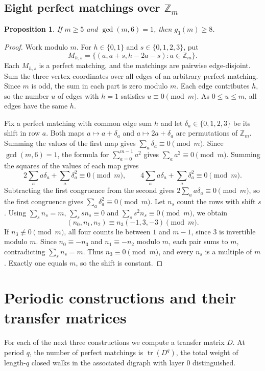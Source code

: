 \documentclass[10pt]{article}
\numberwithin{equation}{section}
\newtheorem{proposition}[proposition]{Proposition}\aliascntresetthe{proposition}
\begin{document}
\subsection{Eight perfect matchings over \texorpdfstring{$\mathbb Z_m$}{Z/mZ}}\label{finite:subsec:modular-eight}
\begin{proposition}\label{finite:prop:eight-coprime}
If $m\ge5$ and $\gcd(m,6)=1$, then $g_3(m)\ge8$.
\end{proposition}
\begin{proof}
Work modulo $m$. For $h\in\{0,1\}$ and $s\in\{0,1,2,3\}$, put
\[
 M_{h,s}=\{(a,a+s,h-2a-s):a\in\mathbb Z_m\}.
\]
Each $M_{h,s}$ is a perfect matching, and the matchings are pairwise edge-disjoint. Sum the three vertex coordinates over all edges of an arbitrary perfect matching. Since $m$ is odd, the sum in each part is zero modulo $m$. Each edge contributes $h$, so the number $u$ of edges with $h=1$ satisfies $u\equiv0\pmod m$. As $0\le u\le m$, all edges have the same $h$.

Fix a perfect matching with common edge sum $h$ and let $\delta_a\in\{0,1,2,3\}$ be its shift in row $a$. Both maps $a\mapsto a+\delta_a$ and $a\mapsto 2a+\delta_a$ are permutations of $\mathbb Z_m$. Summing the values of the first map gives $\sum_a\delta_a\equiv0\pmod m$. Since $\gcd(m,6)=1$, the formula for $\sum_{a=0}^{m-1}a^2$ gives $\sum_a a^2\equiv0\pmod m$. Summing the squares of the values of each map gives
\[
 2\sum_a a\delta_a+\sum_a\delta_a^2\equiv0\pmod m,\qquad
 4\sum_a a\delta_a+\sum_a\delta_a^2\equiv0\pmod m.
\]
Subtracting the first congruence from the second gives $2\sum_a a\delta_a\equiv0\pmod m$, so the first congruence gives $\sum_a\delta_a^2\equiv0\pmod m$. Let $n_s$ count the rows with shift $s$. Using $\sum_s n_s=m$, $\sum_s s n_s\equiv0$ and $\sum_s s^2 n_s\equiv0\pmod m$, we obtain
\[
 (n_0,n_1,n_2)\equiv n_3(-1,3,-3)\pmod m.
\]
If $n_3\not\equiv0\pmod m$, all four counts lie between $1$ and $m-1$, since $3$ is invertible modulo $m$. Since $n_0\equiv-n_3$ and $n_1\equiv-n_2$ modulo $m$, each pair sums to $m$, contradicting $\sum_s n_s=m$. Thus $n_3\equiv0\pmod m$, and every $n_s$ is a multiple of $m$. Exactly one equals $m$, so the shift is constant.
\end{proof}

\section{Periodic constructions and their transfer matrices}\label{finite:sec:periodic}
For each of the next three constructions we compute a transfer matrix $D$. At period $q$, the number of perfect matchings is $\operatorname{tr}(D^q)$, the total weight of length-$q$ closed walks in the associated digraph with layer 0 distinguished.
\end{document}
